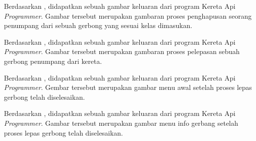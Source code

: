 \documentclass[../main.tex]{subfiles}
\begin{document}
\begin{indentpar}
    \hspace{\parindent}Berdasarkan , didapatkan sebuah gambar keluaran dari program Kereta Api \textit{Programmer}. Gambar tersebut merupakan gambaran proses penghapusan seorang penumpang dari sebuah gerbong yang sesuai kelas dimasukan.
\end{indentpar}


\begin{indentpar}
    \hspace{\parindent}Berdasarkan , didapatkan sebuah gambar keluaran dari program Kereta Api \textit{Programmer}. Gambar tersebut merupakan gambaran proses pelepasan sebuah gerbong penumpang dari kereta.
\end{indentpar}
\blanktop
{}

\begin{indentpar}
    \hspace{\parindent}Berdasarkan , didapatkan sebuah gambar keluaran dari program Kereta Api \textit{Programmer}. Gembar tersebut merupakan gambar menu awal setelah proses lepas gerbong telah diselesaikan.
\end{indentpar}


\begin{indentpar}
    \hspace{\parindent}Berdasarkan , didapatkan sebuah gambar keluaran dari program Kereta Api \textit{Programmer}. Gambar tersebut merupakan gambar menu info gerbang setelah proses lepas gerbong telah diselesaikan.
\end{indentpar}
\end{document}
